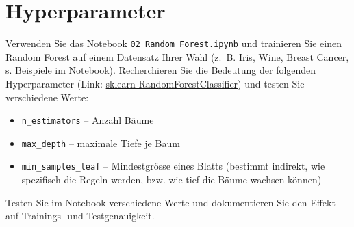 \section{Hyperparameter}

\begin{myexercise}
    Verwenden Sie das Notebook \texttt{02\_Random\_Forest.ipynb} und trainieren Sie einen Random Forest auf einem Datensatz Ihrer Wahl (z.~B. Iris, Wine, Breast Cancer, s. Beispiele im Notebook). Recherchieren Sie die Bedeutung der folgenden Hyperparameter (Link: \href{https://scikit-learn.org/stable/modules/generated/sklearn.ensemble.RandomForestClassifier.html}{sklearn RandomForestClassifier}) und testen Sie verschiedene Werte:

    \begin{itemize}
        \item \texttt{n\_estimators} -- Anzahl Bäume
        \item \texttt{max\_depth} -- maximale Tiefe je Baum
        \item \texttt{min\_samples\_leaf} -- Mindestgrösse eines Blatts (bestimmt indirekt, wie spezifisch die Regeln werden, bzw. wie tief die Bäume wachsen können)
    \end{itemize}
    Testen Sie im Notebook verschiedene Werte und dokumentieren Sie den Effekt
    auf Trainings- und Testgenauigkeit.


\end{myexercise}
